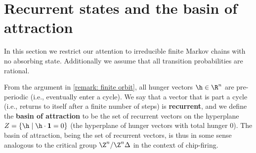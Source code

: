 \section{Recurrent states and the basin of attraction}\label{section: recurrence}

In this section we restrict our attention to irreducible finite Markov chains
with no absorbing state.
Additionally we assume that all transition probabilities are rational.

From the argument in \cref{remark: finite orbit}, 
all hunger vectors $\h\in\R^n$ are pre-periodic (i.e.,
eventually enter a cycle).
We say that a vector that is part a cycle
(i.e., returns to itself after a finite number of steps) is \textbf{recurrent},
and we define the \textbf{basin of attraction} to be 
the set of recurrent vectors on the hyperplane 
$Z=\{\h\mid \h\cdot \mathbf{1} = 0\}$ 
(the hyperplane of hunger vectors with total hunger 0).
The basin of attraction, being the set of recurrent vectors, 
is thus in some sense analogous to the critical group $\Z^n/\Z^n\Delta$ 
in the context of chip-firing.


